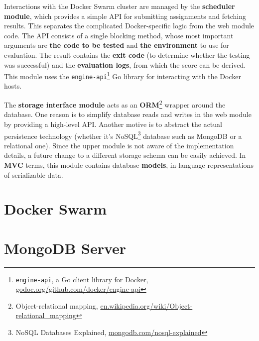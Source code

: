 Interactions with the Docker Swarm cluster are managed by the \textbf{scheduler module}, which provides a simple API for submitting assignments and fetching results. This separates the complicated Docker-specific logic from the web module code. The API consists of a single blocking method, whose most important arguments are \textbf{the code to be tested} and \textbf{the environment} to use for evaluation. The result contains the \textbf{exit code} (to determine whether the testing was successful) and the \textbf{evaluation logs}, from which the score can be derived. This module uses the \texttt{engine-api}\footnote{\texttt{engine-api}, a Go client library for Docker, \url{godoc.org/github.com/docker/engine-api}} Go library for interacting with the Docker hosts.

The \textbf{storage interface module} acts as an \textbf{ORM}\footnote{Object-relational mapping, \url{en.wikipedia.org/wiki/Object-relational_mapping}} wrapper around the database. One reason is to simplify database reads and writes in the web module by providing a high-level API. Another motive is to abstract the actual persistence technology (whether it's NoSQL\footnote{NoSQL Databases Explained, \url{mongodb.com/nosql-explained}} database such as MongoDB or a relational one). Since the upper module is not aware of the implementation details, a future change to a different storage schema can be easily achieved. In \textbf{MVC} terms, this module contains database \textbf{models}, in-language representations of serializable data.


\section{Docker Swarm}
\label{sec:swarm}

\todo


\section{MongoDB Server}
\label{sec:mongo}

\todo{}
